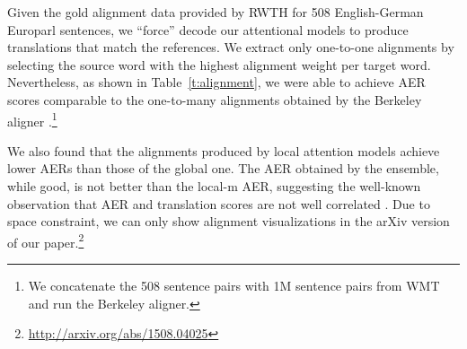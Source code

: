 Given the gold alignment data provided by RWTH for 508 English-German
Europarl sentences, we ``force'' decode our attentional models to
produce translations that match the references. We extract only one-to-one
alignments by selecting the source word with the highest alignment
weight per target word. Nevertheless, as shown in Table~\ref{t:alignment}, we were able to achieve AER scores
comparable to the one-to-many alignments obtained by the Berkeley aligner
\cite{liang06alignment}.\footnote{We concatenate the 508 sentence pairs with 1M
sentence pairs from WMT and run the Berkeley aligner.}

We also found that the alignments produced by local attention models achieve
lower AERs than those of the global one. The AER obtained by the ensemble, while
good, is not better than the local-m AER, suggesting the well-known
observation that AER and translation scores are not well correlated \cite{fraser07}.
Due to space constraint, we can only show alignment visualizations in the arXiv version of our
paper.\footnote{\url{http://arxiv.org/abs/1508.04025}}

